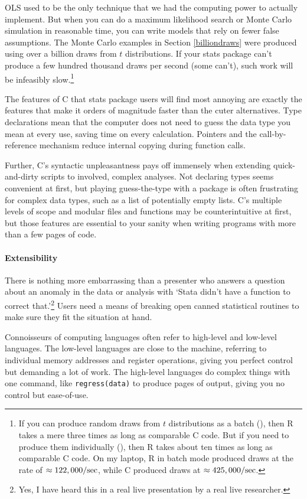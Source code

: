 OLS used to be the only technique that we had the computing power to
actually implement. But when you can do a maximum likelihood search
or Monte Carlo simulation in reasonable time, you can write models
that rely on fewer false assumptions. The Monte Carlo examples in Section
\ref{billiondraws} were produced using over a billion draws from $t$
distributions. If your stats package can't produce a few hundred thousand 
draws per second (some can't), such work will be infeasibly
slow.\footnote{If you can produce random draws from $t$ distributions
as a batch (), then R takes a mere three
times as long as comparable C code. But if you need to produce them
individually (), then R 
takes about ten times as long as comparable C code. On my laptop, R in
batch mode produced draws at the rate of $\approx 122,000/{\rm sec}$,
while C produced draws at $\approx 425,000/{\rm sec}$.}

The features of C that stats package users will find most annoying are
exactly the features that make it orders of magnitude faster than the cuter
alternatives.  Type declarations mean that the computer does not need
to guess the data type you mean at every use, saving time on
every calculation.  Pointers and the call-by-reference mechanism reduce
internal copying during function calls.

Further, C's syntactic unpleasantness pays off immensely when extending
quick-and-dirty scripts to involved, complex analyses.
Not declaring types seems convenient at first, but playing guess-the-type
with a package is often frustrating for complex data types, such
as a list of potentially empty lists. C's multiple levels of scope and 
modular files and functions may be counterintuitive at first,
but those features are essential to your sanity when
writing programs with more than a few pages of code.

\paragraph{Extensibility}
There is nothing more embarrassing than a presenter who answers a question
about an anomaly in the data or analysis with `Stata didn't have a function to
correct that.'\footnote{Yes, I have heard this in a real live presentation
by a real live researcher.} Users need a means of breaking open canned
statistical routines to make sure they fit the situation at hand.

Connoisseurs of computing languages often refer to high-level and
low-level languages. The low-level languages are close to the machine,
referring to individual memory addresses and register operations,
giving you perfect control but demanding a lot of work. The high-level
languages do complex things with one command, like {\tt regress(data)}
to produce pages of output, giving you no control but ease-of-use.

